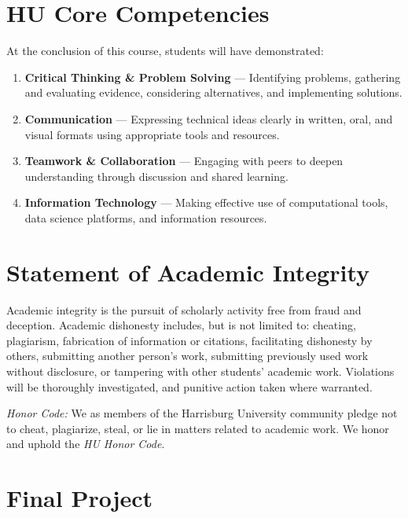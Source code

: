 \documentclass[
  10pt,
]{article}
\begin{document}
\section*{HU Core Competencies}\label{hu-core-competencies}

At the conclusion of this course, students will have demonstrated:

\begin{enumerate}
\def\labelenumi{\arabic{enumi}.}
\item
  \textbf{Critical Thinking \& Problem Solving} --- Identifying
  problems, gathering and evaluating evidence, considering alternatives,
  and implementing solutions.
\item
  \textbf{Communication} --- Expressing technical ideas clearly in
  written, oral, and visual formats using appropriate tools and
  resources.
\item
  \textbf{Teamwork \& Collaboration} --- Engaging with peers to deepen
  understanding through discussion and shared learning.
\item
  \textbf{Information Technology} --- Making effective use of
  computational tools, data science platforms, and information
  resources.
\end{enumerate}

\section*{Statement of Academic
Integrity}\label{statement-of-academic-integrity}

Academic integrity is the pursuit of scholarly activity free from fraud
and deception. Academic dishonesty includes, but is not limited to:
cheating, plagiarism, fabrication of information or citations,
facilitating dishonesty by others, submitting another person's work,
submitting previously used work without disclosure, or tampering with
other students' academic work. Violations will be thoroughly
investigated, and punitive action taken where warranted.

\emph{Honor Code:} We as members of the Harrisburg University community
pledge not to cheat, plagiarize, steal, or lie in matters related to
academic work. We honor and uphold the \emph{HU Honor Code}.

\section*{Final Project}\label{final-project}
\end{document}

